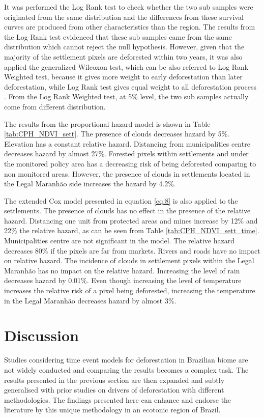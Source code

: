 It was performed the Log Rank test \citep{Peto_1972} to check whether the two sub samples were originated from the same distribution and the differences from these survival curves are produced from other characteristics than the region. The results from the Log Rank test evidenced that these sub samples came from the same distribution which cannot reject the null hypothesis. However, given that the majority of the settlement pixels are deforested within two years, it was also applied the generalized Wilcoxon test, which can be also referred to Log Rank Weighted test, because it gives more weight to early deforestation than later deforestation, while Log Rank test gives equal weight to all deforestation process \citep{lee_wang_2003}. From the Log Rank Weighted test, at 5\% level, the two sub samples actually come from different distribution.

The results from the proportional hazard model is shown in Table \ref{tab:CPH_NDVI_sett}. The presence of clouds decreases hazard by 5\%. Elevation has a constant relative hazard. Distancing from municipalities centre decreases hazard by almost 27\%. Forested pixels within settlements and under the monitored policy area has a decreasing risk of being deforested comparing to non monitored areas. However, the presence of clouds in settlements located in the Legal Maranhão side increases the hazard by 4.2\%.


The extended Cox model presented in equation \ref{eq:8} is also applied to the settlements. The presence of clouds has no effect in the presence of the relative hazard. Distancing one unit from protected areas and mines increase by 12\% and 22\% the relative hazard, as can be seen from Table \ref{tab:CPH_NDVI_sett_time}. Municipalities centre are not significant in the model. The relative hazard decreases 80\% if the pixels are far from markets. Rivers and roads have no impact on relative hazard. The incidence of clouds in settlement pixels within the Legal Maranhão has no impact on the relative hazard. Increasing the level of rain decreases hazard by 0.01\%. Even though increasing the level of temperature increases the relative risk of a pixel being deforested, increasing the temperature in the Legal Maranhão decreases hazard by almost 3\%.


\section{Discussion} 
\label{S:5}
Studies considering time event models for deforestation in Brazilian biome are not widely conducted and comparing the results becomes a complex task. The results presented in the previous section are then expanded and subtly generalised with prior studies on drivers of deforestation with different methodologies. The findings presented here can enhance and endorse the literature by this unique methodology in an ecotonic region of Brazil.

